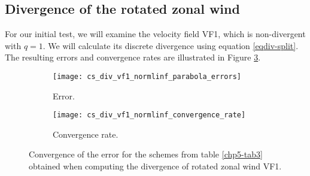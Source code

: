 \subsection{Divergence of the rotated zonal wind}
For our initial test, we will examine the velocity field VF1, which is non-divergent with $q=1$.
We will calculate its discrete divergence using equation \eqref{eqdiv-split}.
The resulting errors and convergence rates are illustrated in Figure \ref{chp5-error-div}.
\begin{figure}[!htb]
	\centering
	\begin{subfigure}{0.42\textwidth}
		\centering
		\texttt{[image: cs\_div\_vf1\_normlinf\_parabola\_errors]}
		\caption{Error.\label{chp5-errordiv}}
	\end{subfigure}
	\begin{subfigure}{0.42\textwidth}
		\centering
		\texttt{[image: cs\_div\_vf1\_normlinf\_convergence\_rate]}
		\caption{Convergence rate.\label{chp5-crdiv}}
	\end{subfigure}
	\caption{Convergence of the error for the schemes from table \ref{chp5-tab3} obtained when computing the divergence of rotated zonal wind VF1.
	\label{chp5-error-div}}
\end{figure}

